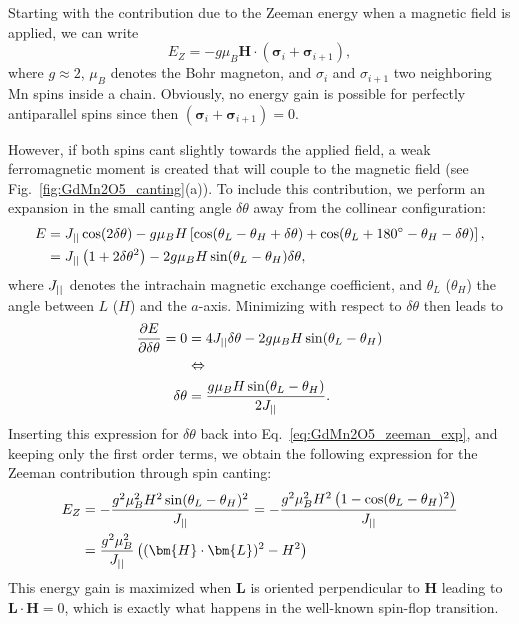 Starting with the contribution due to the Zeeman energy when a magnetic field is applied, we can write 
\begin{equation}
	E_Z = -g \mu_B \bm{H} \cdot (\pmb{\sigma}_i + \pmb{\sigma}_{i+1})\nonumber,
\end{equation}
where $g \approx 2$, $\mu_B$ denotes the Bohr magneton, and $\sigma_i$ and $\sigma_{i+1}$ two neighboring Mn spins inside a chain. 
Obviously, no energy gain is possible for perfectly antiparallel spins since then $(\pmb{\sigma}_i + \pmb{\sigma}_{i+1})=0$.

However, if both spins cant slightly towards the applied field, a weak ferromagnetic moment is created that will couple to the magnetic field (see Fig.~\ref{fig:GdMn2O5_canting}(a)).
To include this contribution, we perform an expansion in the small canting angle $\delta \theta$ away from the collinear configuration:
\begin{align}
	E &= J_{||} \cos(2\delta \theta) - g \mu_B H \left[\cos(\theta_L - \theta_H + \delta \theta) + \cos(\theta_L + 180^\circ - \theta_H - \delta \theta)\right],\nonumber\\
	&= J_{||} \left( 1+2\delta\theta^2 \right) - 2 g \mu_B H \sin(\theta_L - \theta_H)\delta\theta \label{eq:GdMn2O5_zeeman_exp},
\end{align}
where $J_{||}$ denotes the intrachain magnetic exchange coefficient, and $\theta_L$ ($\theta_H$) the angle between $L$ ($H$) and the $a$-axis.
Minimizing with respect to $\delta \theta$ then leads to
\begin{align}
	\frac{\partial E}{\partial \delta \theta} = 0 &= 4 J_{||} \delta \theta - 2 g \mu_B H \sin(\theta_L - \theta_H) \nonumber\\
	&\Leftrightarrow \nonumber\\
	\delta \theta &= \frac{g\mu_B H \sin(\theta_L - \theta_H)}{2 J_{||}}.\nonumber
\end{align}
Inserting this expression for $\delta \theta$ back into Eq.~\eqref{eq:GdMn2O5_zeeman_exp}, and keeping only the first order terms, we obtain the following expression for the Zeeman contribution through spin canting:
\begin{align}
	E_Z &= -\frac{g^2\mu_B^2 H^2 \sin(\theta_L - \theta_H)^2}{\Jpar} = -\frac{g^2\mu_B^2 H^2 \left(1 - \cos(\theta_L - \theta_H)^2\right)}{\Jpar} \nonumber\\
	&=\frac{g^2\mu_B^2}{\Jpar}\left((\bm{H}\cdot\bm{L})^2 - H^2\right)\nonumber
\end{align}
This energy gain is maximized when $\bm{L}$ is oriented perpendicular to $\bm{H}$ leading to $\bm L \cdot \bm H = 0$, which is exactly what happens in the well-known spin-flop transition.

